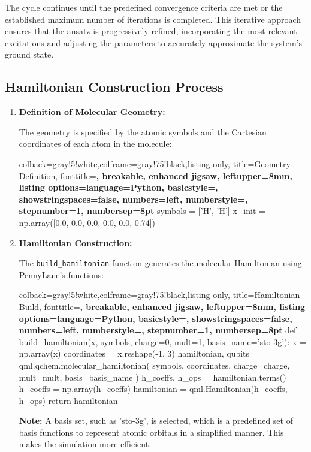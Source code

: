 The cycle continues until the predefined convergence criteria are met or the established maximum number of iterations is completed. This iterative approach ensures that the ansatz is progressively refined, incorporating the most relevant excitations and adjusting the parameters to accurately approximate the system's ground state.

\subsection{Hamiltonian Construction Process}

\begin{enumerate}
    \item \textbf{Definition of Molecular Geometry:}
    
    The geometry is specified by the atomic symbols and the Cartesian coordinates of each atom in the molecule:
    
    \begin{tcblisting}{colback=gray!5!white,colframe=gray!75!black,listing only,
      title=Geometry Definition, fonttitle=\bfseries, breakable, enhanced jigsaw, leftupper=8mm,
      listing options={language=Python, basicstyle=\ttfamily\small,
      showstringspaces=false, numbers=left, numberstyle=\footnotesize, stepnumber=1, numbersep=8pt}}
symbols = ['H', 'H']
x_init = np.array([0.0, 0.0, 0.0, 0.0, 0.0, 0.74]) 
    \end{tcblisting}
    
    
    \item \textbf{Hamiltonian Construction:}
    
    The \texttt{build\_hamiltonian} function generates the molecular Hamiltonian using PennyLane's functions:
    
    \begin{tcblisting}{colback=gray!5!white,colframe=gray!75!black,listing only,
      title=Hamiltonian Build, fonttitle=\bfseries, breakable, enhanced jigsaw, leftupper=8mm,
      listing options={language=Python, basicstyle=\ttfamily\small,
      showstringspaces=false, numbers=left, numberstyle=\footnotesize, stepnumber=1, numbersep=8pt}}
def build_hamiltonian(x, symbols, charge=0, mult=1, basis_name='sto-3g'):
    x = np.array(x)
    coordinates = x.reshape(-1, 3)
    hamiltonian, qubits = qml.qchem.molecular_hamiltonian(
        symbols, coordinates, charge=charge, mult=mult, basis=basis_name
    )
    h_coeffs, h_ops = hamiltonian.terms()
    h_coeffs = np.array(h_coeffs)
    hamiltonian = qml.Hamiltonian(h_coeffs, h_ops)
    return hamiltonian
    \end{tcblisting}
    \textbf{Note:}
    A basis set, such as 'sto-3g', is selected, which is a predefined set of basis functions to represent atomic orbitals in a simplified manner. This makes the simulation more efficient.
    

\end{enumerate}
